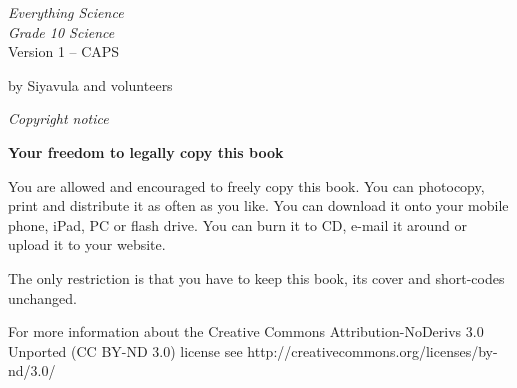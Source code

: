 
\begin{titlepage}
\begin{center}
    \thispagestyle{empty}

    \vspace*{4in}

    
    {\normalfont\sffamily\fontsize{36}\normalfont\itshape{Everything Science} \\ \vspace*{1cm}
     \normalfont\sffamily\fontsize{22}\normalfont\itshape{Grade 10 Science}}
    \vspace*{1in} \\
    \LARGE Version 1 -- CAPS \\

   {\vspace*{2in}
     by Siyavula and volunteers 
  

\vfill

    }
\end{center}
\end{titlepage}






\newpage
\thispagestyle{empty}
\begin{center}
\normalfont\sffamily\fontsize{22}\normalfont\itshape Copyright notice\\

\vspace*{1in}

\textbf{Your freedom to legally copy this book}\\

\end{center}


{\LARGE
You are allowed and encouraged to freely copy this book. You can photocopy, print and distribute it as
often as you like. You can download it onto your mobile phone, iPad, PC or flash drive. You can burn it
to CD, e-mail it around or upload it to your website. \par

The only restriction is that you have to keep this book, its cover and short-codes unchanged.\par

For more information about the Creative Commons Attribution-NoDerivs 3.0 Unported (CC BY-ND
3.0) license see http://creativecommons.org/licenses/by-nd/3.0/}\\

